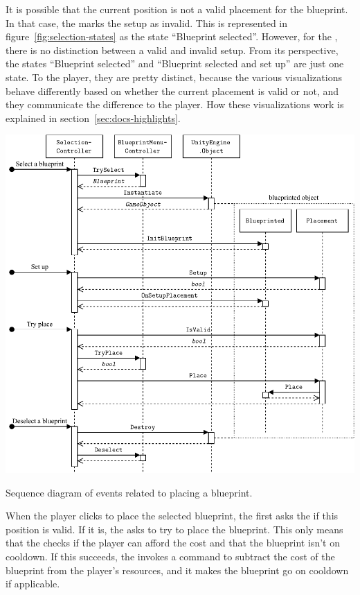 It is possible that the current position is not a valid placement for the blueprint.
In that case, the  marks the setup as invalid.
This is represented in figure~\ref{fig:selection-states} as the state \enquote{Blueprint selected}.
However, for the , there is no distinction between a valid and invalid setup.
From its perspective, the states \enquote{Blueprint selected} and \enquote{Blueprint selected and set up} are just one state.
To the player, they are pretty distinct, because the various visualizations behave differently based on whether the current placement is valid or not, and they communicate the difference to the player.
How these visualizations work is explained in section~\ref{sec:docs-highlights}.

\begin{center}
    \captionsetup{type=figure}
    \includegraphics[width=\textwidth]{img/placing a blueprint.pdf}
    \caption{Sequence diagram of events related to placing a blueprint.}
    \label{fig:placing-blueprint}
\end{center}

When the player clicks to place the selected blueprint, the  first asks the  if this position is valid.
If it is, the  asks  to try to place the blueprint.
This only means that the  checks if the player can afford the cost and that the blueprint isn't on cooldown.
If this succeeds, the  invokes a command to subtract the cost of the blueprint from the player's resources, and it makes the blueprint go on cooldown if applicable.

